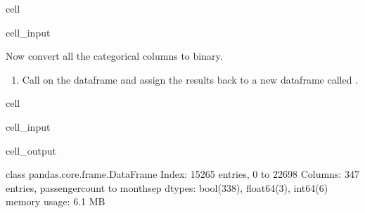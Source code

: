 \documentclass[letterpaper,10pt,english]{sphinxmanual}
\begin{document}
\begin{sphinxuseclass}{cell}
\begin{sphinxuseclass}{cell_input}
\begin{sphinxVerbatim}[commandchars=\\\{\}]
  \PYG{p}{[}   \PYG{p}{]}

   
    \PYG{p}{[}\PYG{p}{]}  \PYG{p}{[}\PYG{p}{]}
\end{sphinxVerbatim}

\end{sphinxuseclass}
\end{sphinxuseclass}
\sphinxAtStartPar
Now convert all the categorical columns to binary.
\begin{enumerate}
%
\item {} 
\sphinxAtStartPar
Call  on the dataframe and assign the results back to a new dataframe called .

\end{enumerate}

\begin{sphinxuseclass}{cell}
\begin{sphinxuseclass}{cell_input}
\begin{sphinxVerbatim}[commandchars=\\\{\}]
   
\end{sphinxVerbatim}

\end{sphinxuseclass}
\begin{sphinxuseclass}{cell_output}
\begin{sphinxVerbatim}[commandchars=\\\{\}]
\PYGZlt{}class \PYGZsq{}pandas.core.frame.DataFrame\PYGZsq{}\PYGZgt{}
Index: 15265 entries, 0 to 22698
Columns: 347 entries, passenger\PYGZus{}count to month\PYGZus{}sep
dtypes: bool(338), float64(3), int64(6)
memory usage: 6.1 MB
\end{sphinxVerbatim}

\end{sphinxuseclass}
\end{sphinxuseclass}
\end{document}
